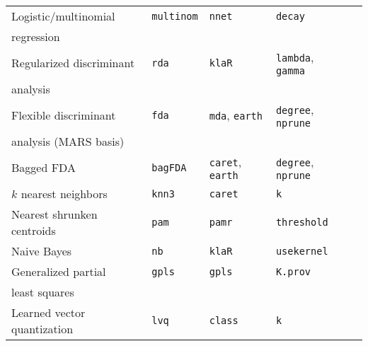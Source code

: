 \documentclass[12pt]{article}
\begin{document}
\begin{table}[hp]
\begin{center}
\begin{tabular}{lllll}
      Logistic/multinomial  &
         \texttt{multinom} & 
            \texttt{nnet}       & 
            \texttt{decay}& \\   
      \: \: regression \\ 
                     
      Regularized discriminant  &
         \texttt{rda} & 
            \texttt{klaR}       & 
            \texttt{lambda}, \texttt{gamma} & \\
      \: \: analysis \\
      
      Flexible discriminant  &
         \texttt{fda} & 
            \texttt{mda}, \texttt{earth}       & 
            \texttt{degree}, \texttt{nprune} & \\
      \: \: analysis (MARS basis)\\      
      
      Bagged FDA &
         \texttt{bagFDA} & 
            \texttt{caret},  \texttt{earth}       & 
            \texttt{degree}, \texttt{nprune} \\         
                   
      $k$ nearest neighbors &
         \texttt{knn3} & 
            \texttt{caret}       & 
            \texttt{k} \\   
                  
      Nearest shrunken centroids &
         \texttt{pam} & 
            \texttt{pamr}       & 
            \texttt{threshold} \\  
                                                                   
      Naive Bayes &
         \texttt{nb} & 
            \texttt{klaR}       & 
            \texttt{usekernel} \\
        
      Generalized partial &
         \texttt{gpls} & 
            \texttt{gpls}       & 
            \texttt{K.prov} \\
      \:\: least squares \\
      
      Learned vector quantization &
         \texttt{lvq} & 
            \texttt{class}       &          
            \texttt{k} \\                             
      \end{tabular}      
   \end{center}
\end{table}  
\end{document}
